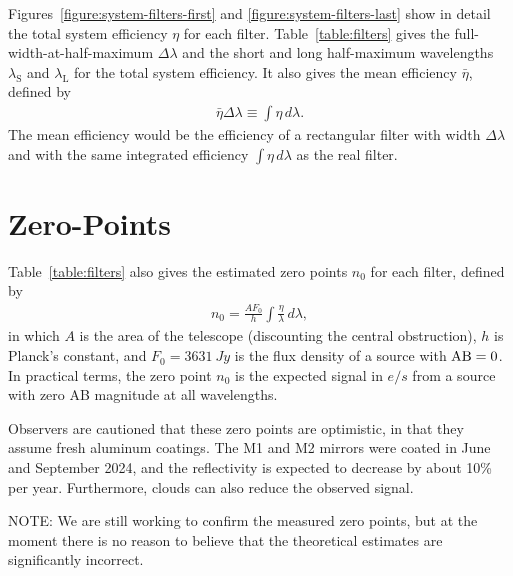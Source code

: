 Figures~\ref{figure:system-filters-first} and \ref{figure:system-filters-last} show in detail the total system efficiency $\eta$ for each filter. Table~\ref{table:filters} gives the full-width-at-half-maximum $\Delta\lambda$ and the short and long half-maximum wavelengths $\lambda_\mathrm{S}$ and $\lambda_\mathrm{L}$ for the total system efficiency. It also gives the mean efficiency $\bar\eta$, defined by
\begin{align}
\bar\eta \Delta\lambda \equiv \int \eta\,d\lambda.
\end{align}
The mean efficiency would be the efficiency of a rectangular filter with width $\Delta\lambda$ and with the same integrated efficiency $\int \eta\,d\lambda$ as the real filter.

\section{Zero-Points}

Table~\ref{table:filters} also gives the estimated zero points $n_0$ for each filter, defined by 
\begin{align}
n_0 = \frac{A F_0}{h}\int \frac{\eta}{\lambda}\,d\lambda,
\end{align}
in which $A$ is the area of the telescope (discounting the central obstruction), $h$ is Planck's constant, and $F_0 = 3631~\unit{Jy}$ is the flux density of a source with $\mbox{AB} = 0$. In practical terms, the zero point $n_0$ is the expected signal in $\unit{e/s}$ from a source with zero AB magnitude at all wavelengths.

Observers are cautioned that these zero points are optimistic, in that they assume fresh aluminum coatings. The M1 and M2 mirrors were coated in June and September 2024, and the reflectivity is expected to decrease by about 10\% per year. Furthermore, clouds can also reduce the observed signal.

NOTE: We are still working to confirm the measured zero points, but at the moment there is no reason to believe that the theoretical estimates are significantly incorrect.
